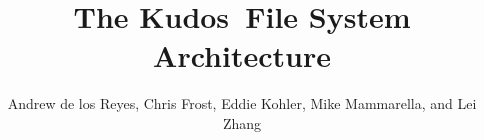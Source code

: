 \documentclass[10pt,twocolumn,letterpaper]{article}
\newcommand{\Kudos}{Kudos}
\begin{document}
\normalsize

\title{\sffamily\textbf{The \Kudos\ File System Architecture}}


\author{\sffamily Andrew de los Reyes, Chris Frost, Eddie Kohler, Mike
Mammarella, and Lei Zhang \\
\noalign{\vskip2pt}
 \\
\noalign{\vskip2pt}
 \\
\noalign{\vskip-.25in}
\null}
\date{}
\maketitle

\def\assast{\raise.2ex\hbox{$^\ast$}}



















\end{document}
